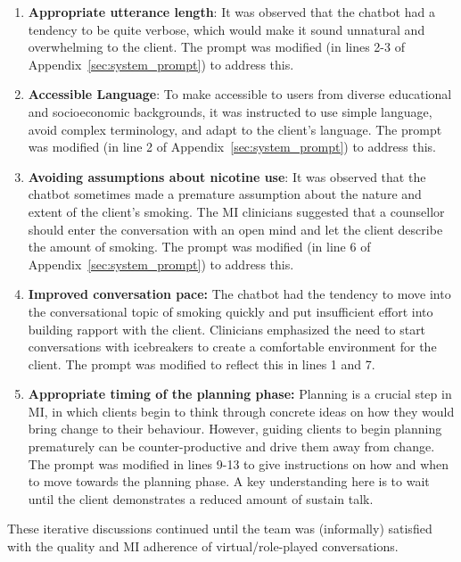 \begin{enumerate}[itemsep=0pt, parsep=0pt]
    \item \textbf{Appropriate utterance length}: It was observed that the chatbot had a tendency to be quite verbose, which would make it sound unnatural and overwhelming to the client. The prompt was modified (in lines 2-3 of Appendix~\ref{sec:system_prompt}) to address this.

    \item \textbf{Accessible Language}: To make \sysname accessible to users from diverse educational and socioeconomic backgrounds, it was instructed to use simple language, avoid complex terminology, and adapt to the client's language. The prompt was modified (in line 2 of Appendix~\ref{sec:system_prompt}) to address this.

    \item \textbf{Avoiding assumptions about nicotine use}: It was observed that the chatbot sometimes made a premature assumption about the nature and extent of the client's smoking. The MI clinicians suggested that a counsellor should enter the conversation with an open mind and let the client describe the amount of smoking. The prompt was modified (in line 6 of Appendix~\ref{sec:system_prompt}) to address this.

    \item \textbf{Improved conversation pace:} The chatbot had the tendency to move into the conversational topic of smoking quickly and put insufficient effort into building rapport with the client. Clinicians emphasized the need to start conversations with icebreakers to create a comfortable environment for the client. The prompt was modified to reflect this in lines 1 and 7.

    \item \textbf{Appropriate timing of the planning phase:} Planning is a crucial step in MI, in which clients begin to think through concrete ideas on how they would bring change to their behaviour. However, guiding clients to begin planning prematurely can be counter-productive and drive them away from change. The prompt was modified in lines 9-13 to give instructions on how and when to move towards the planning phase. A key understanding here is to wait until the client demonstrates a reduced amount of sustain talk.
\end{enumerate}


These iterative discussions continued until the team was (informally) satisfied with the quality and MI adherence of virtual/role-played conversations.


